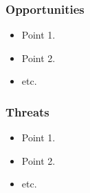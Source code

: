 \documentclass[a4paper,11pt]{article}%
\begin{document}
\subsubsection*{Opportunities}
\begin{itemize}
\item Point 1.
\item Point 2.
\item etc.
\end{itemize}

\subsubsection*{Threats}
\begin{itemize}
\item Point 1.
\item Point 2.
\item etc.
\end{itemize}
\end{document}
